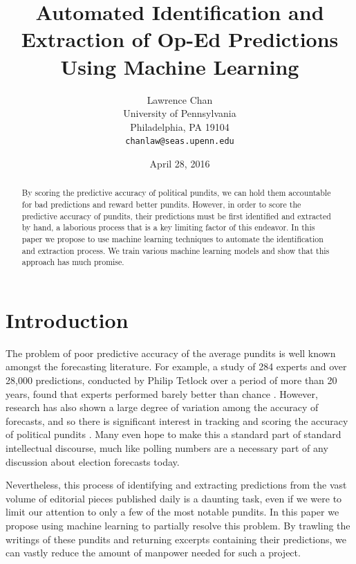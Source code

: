 \documentclass[11pt,letterpaper]{article}
\title{Automated Identification and Extraction of Op-Ed Predictions Using Machine Learning\Thanks{This research was conducted under the guidance of Professor Chris Callison-Burch ({\tt ccb@cis.upenn.edu}), at the Computer Science Department of the University of Pennsylvania.}}
\date{April 28, 2016}
\author{Lawrence Chan\\
		University of Pennsylvania\\
        Philadelphia, PA 19104\\
	    {\tt chanlaw@seas.upenn.edu}}
\begin{document}
\maketitle

\begin{abstract}
By scoring the predictive accuracy of political pundits, we can hold them accountable for bad predictions and reward better pundits. However, in order to score the predictive accuracy of pundits, their predictions must be first identified and extracted by hand, a laborious process that is a key limiting factor of this endeavor. In this paper we propose to use machine learning techniques to automate the identification and extraction process. We train various machine learning models and show that this approach has much promise. 
\end{abstract}

\section{Introduction}
The problem of poor predictive accuracy of the average pundits is well known amongst the forecasting literature. For example, a study of 284 experts and over 28,000 predictions, conducted by Philip Tetlock over a period of more than 20 years, found that experts performed barely better than chance \cite{Tetlock:05}. However, research has also shown a large degree of variation among the accuracy of forecasts, and so there is significant interest in tracking and scoring the accuracy of political pundits \cite{Tetlock:16}. Many even hope to make this a standard part of standard intellectual discourse, much like polling numbers are a necessary part of any discussion about election forecasts today. 

Nevertheless, this process of identifying and extracting predictions from the vast volume of editorial pieces published daily is a daunting task, even if we were to limit our attention to only a few of the most notable pundits. In this paper we propose using machine learning to partially resolve this problem. By trawling the writings of these pundits and returning excerpts containing their predictions, we can vastly reduce the amount of manpower needed for such a project. 
\end{document}
